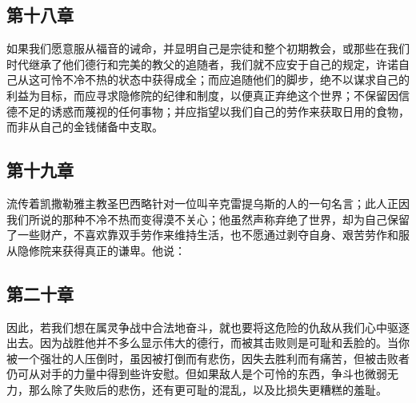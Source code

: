 
\subsection{第十八章}

\par

如果我们愿意服从福音的诫命，并显明自己是宗徒和整个初期教会，或那些在我们时代继承了他们德行和完美的教父的追随者，我们就不应安于自己的规定，许诺自己从这可怜不冷不热的状态中获得成全；而应追随他们的脚步，绝不以谋求自己的利益为目标，而应寻求隐修院的纪律和制度，以便真正弃绝这个世界；不保留因信德不足的诱惑而蔑视的任何事物；并应指望以我们自己的劳作来获取日用的食物，而非从自己的金钱储备中支取。\par


\subsection{第十九章}

\par

流传着凯撒勒雅主教圣巴西略针对一位叫辛克雷提乌斯的人的一句名言；此人正因我们所说的那种不冷不热而变得漠不关心；他虽然声称弃绝了世界，却为自己保留了一些财产，不喜欢靠双手劳作来维持生活，也不愿通过剥夺自身、艰苦劳作和服从隐修院来获得真正的谦卑。他说：\par


\subsection{第二十章}

\par

因此，若我们想在属灵争战中合法地奋斗，就也要将这危险的仇敌从我们心中驱逐出去。因为战胜他并不多么显示伟大的德行，而被其击败则是可耻和丢脸的。当你被一个强壮的人压倒时，虽因被打倒而有悲伤，因失去胜利而有痛苦，但被击败者仍可从对手的力量中得到些许安慰。但如果敌人是个可怜的东西，争斗也微弱无力，那么除了失败后的悲伤，还有更可耻的混乱，以及比损失更糟糕的羞耻。\par

